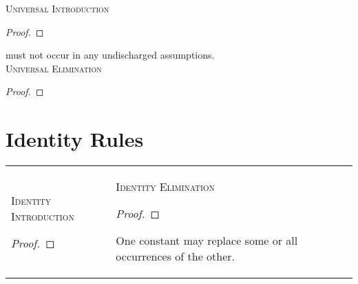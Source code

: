 \vspace{18pt}
\noindent\textsc{Universal Introduction}\vspace{.5ex}
\vspace{-9pt}
\begin{proof}	
	 \end{proof} \vspace{.5ex}
 must not occur in any undischarged assumptions.\\

\vspace{18pt}
\noindent\textsc{Universal Elimination} \vspace{.5ex}
\vspace{-9pt}
\begin{proof}	
	 \end{proof} \vspace{.5ex}



\section*{Identity Rules}

\begin{longtabu}{X[1,l]X[1,l]}
\textsc{Identity Introduction}\vspace{.5ex}
\begin{proof}
	 
\end{proof}\vspace{.5ex}

&

\textsc{Identity Elimination}\vspace{.5ex}
\begin{proof}	
	 	 
\end{proof} \vspace{9pt}

One constant may replace some or all occurrences of the other.\vspace{.5ex}

\end{longtabu}


